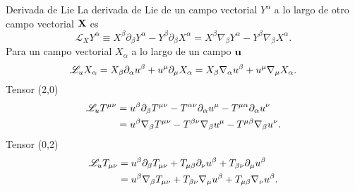 \begin{definition}{Derivada de Lie}{}
    La derivada de Lie de un campo vectorial $Y^\alpha$ a lo largo de otro campo vectorial $\mathbf{X}$ es
    \begin{equation}
        \mathscr{L}_X Y^\alpha \equiv  X^\beta \partial_\beta Y^\alpha-Y^\beta \partial_\beta X^\alpha= X^\beta \nabla_\beta Y^\alpha  - Y^\beta \nabla_\beta X^\alpha .
    \end{equation}
    Para un campo vectorial $X_\alpha$ a lo largo de un campo $\mathbf{u}$
    \begin{equation}
        \mathscr{L}_u X_\alpha=X_\beta \partial_\alpha u^\beta+u^\mu \partial_\mu X_\alpha =X_\beta \mathbf{\nabla}_\alpha u^\beta+u^\mu \mathbf{\nabla}_\mu X_\alpha.
    \end{equation}
    Tensor (2,0)
    \begin{equation}
        \begin{aligned}
            \mathscr{L}_u T^{\mu \nu} & = u^\beta \partial_\beta T^{\mu \nu}   -  T^{\alpha \nu} \partial_\alpha u^\mu  -T^{\mu \alpha} \partial_\alpha u^\nu \\
                                      & = u^\beta \mathbf{\nabla}_\beta T^{\mu \nu}-T^{\beta \nu}\mathbf{\nabla}_\beta u^\mu - T^{\mu \beta } \mathbf{\nabla}_\beta u^\nu.
        \end{aligned}
    \end{equation}
    Tensor (0,2)
    \begin{equation}
        \begin{aligned}
            \mathscr{L}_u T_{\mu \nu} & = u^\beta \partial_\beta T_{\mu \nu}   +  T_{\mu \beta } \partial_\nu u^\beta  + T_{ \beta \nu} \partial_\mu u^\beta \\
                                      & = u^\beta \mathbf{\nabla}_\beta T_{\mu \nu}+T_{\beta \nu}\mathbf{\nabla}_\mu u^\beta +T_{\mu \beta } \mathbf{\nabla}_\nu u^\beta.
        \end{aligned}
    \end{equation}
\end{definition}


